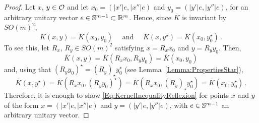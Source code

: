 \begin{proof}
Let $x$, $y \in \mathcal{O}$ and let $x_0 = (|x'|e, |x''|e)$ and $y_0 = (|y'|e, |y''|e)$, for an arbitrary unitary vector $e \in \mathbb{S}^{m-1} \subset \mathbb{R}^m$. Hence, since $\overline{K}$ is invariant by $SO(m)^2$, 
	$$
	\overline{K}(x,y) = \overline{K}(x_0, y_0) \quad \text{ and } \quad \overline{K}(x,y^\star) =   \overline{K}(x_0, y_0^\star)\,.
	$$
	To see this, let $R_x$, $R_y \in SO(m)^2$ satisfying $x = R_x x_0$ and $y = R_y y_0$. Then, 
	$$
	\overline{K}(x,y) = \overline{K}(R_x x_0,R_y y_0)  = \overline{K}(x_0, y_0)
	$$
	and, using that $(R_y y_0)^\star = (R_y)_\star y_0^\star$ (see Lemma~\ref{Lemma:PropertiesStar}),
	$$
	\overline{K}(x,y^\star) = \overline{K}(R_x x_0,(R_y y_0)^\star) = \overline{K}(R_x x_0,(R_y)_\star y_0^\star)  = \overline{K}(x_0, y_0^\star)\,.
	$$
	Therefore, it is enough to show \eqref{Eq:KernelInequalityReflexion} for points $x$ and $y$ of the form $x = (|x'|e, |x''|e)$ and $y = (|y'|e, |y''|e)$, with $e \in \mathbb{S}^{m-1}$ an arbitrary unitary vector.


\end{proof}
